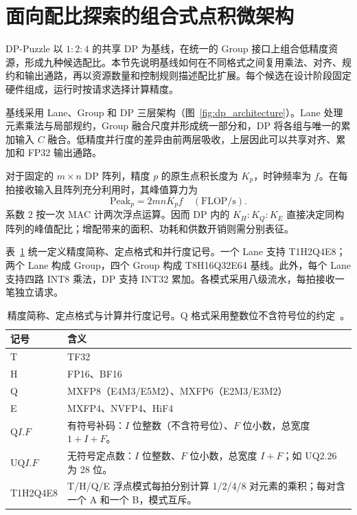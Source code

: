 \section{面向配比探索的组合式点积微架构}
\label{sec:architecture}
\label{sec:brick_definition}

DP-Puzzle 以 $1:2:4$ 的共享 DP 为基线，在统一的 Group 接口上组合低精度资源，形成九种候选配比。本节先说明基线如何在不同格式之间复用乘法、对齐、规约和输出通路，再以资源数量和控制规则描述配比扩展。每个候选在设计阶段固定硬件组成，运行时按请求选择计算精度。

基线采用 Lane、Group 和 DP 三层架构（图~\ref{fig:dp_architecture}）。Lane 处理元素乘法与局部规约，Group 融合尺度并形成统一部分和，DP 将各组与唯一的累加输入 $C$ 融合。低精度并行度的差异由前两层吸收，上层因此可以共享对齐、累加和 FP32 输出通路。

对于固定的 $m\times n$ DP 阵列，精度 $p$ 的原生点积长度为 $K_p$，时钟频率为 $f$。在每拍接收输入且阵列充分利用时，其峰值算力为
\begin{equation}
\mathrm{Peak}_p=2mnK_pf\quad(\mathrm{FLOP/s}).
\label{eq:array_peak_throughput}
\end{equation}
系数 2 按一次 MAC 计两次浮点运算。因而 DP 内的 $K_H:K_Q:K_E$ 直接决定同构阵列的峰值配比；增配带来的面积、功耗和供数开销则需分别表征。

表~\ref{tab:precision_families} 统一定义精度简称、定点格式和并行度记号。一个 Lane 支持 T1H2Q4E8；两个 Lane 构成 Group，四个 Group 构成 T8H16Q32E64 基线。此外，每个 Lane 支持四路 INT8 乘法，DP 支持 INT32 累加。各模式采用八级流水，每拍接收一笔独立请求。

\begin{table}[t]
\centering
\caption{精度简称、定点格式与计算并行度记号。Q 格式采用整数位不含符号位的约定~\cite{ti2003qformat}。}
\label{tab:precision_families}
\begingroup
\footnotesize
\setlength{\tabcolsep}{3pt}
\renewcommand{\arraystretch}{1.0}
\begin{tabular}{@{}p{}p{}@{}}
\toprule
记号 & 含义 \\
\midrule
T & TF32 \\
H & FP16、BF16 \\
Q & MXFP8（E4M3/E5M2）、MXFP6（E2M3/E3M2） \\
E & MXFP4、NVFP4、HiF4 \\
\midrule
$\mathrm{Q}I.F$ & 有符号补码：$I$ 位整数（不含符号位）、$F$ 位小数，总宽度 $1+I+F$。 \\
$\mathrm{UQ}I.F$ & 无符号定点数：$I$ 位整数、$F$ 位小数，总宽度 $I+F$；如 UQ2.26 为 28 位。 \\
T1H2Q4E8 & T/H/Q/E 浮点模式每拍分别计算 1/2/4/8 对元素的乘积；每对含一个 A 和一个 B，模式互斥。 \\
\bottomrule
\end{tabular}
\endgroup
\end{table}

